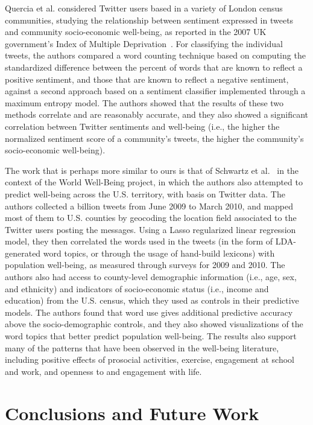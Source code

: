 \documentclass{acm_proc_article-sp}
\begin{document}
Quercia et al. considered Twitter users based in a variety of London census communities, studying the relationship between sentiment expressed in tweets and community socio-economic well-being, as reported in the 2007 UK government’s Index of Multiple Deprivation~\cite{Quercia:2012:TGC:2145204.2145347}. For classifying the individual tweets, the authors compared a word counting technique based on computing the standardized difference between the percent of words that are known to reflect a positive sentiment, and those that are known to reflect a negative sentiment, against a second approach based on a sentiment classifier implemented through a maximum entropy model. The authors showed that the results of these two methods correlate and are reasonably accurate, and they also showed a significant correlation between Twitter sentiments and well-being (i.e., the higher the normalized sentiment score of a community’s tweets, the higher the community’s socio-economic well-being).

The work that is perhaps more similar to ours is that of Schwartz et al.~\cite{Schwartz:2013:Tweets} in the context of the World Well-Being project, in which the authors also attempted to predict well-being across the U.S. territory, with basis on Twitter data. The authors collected a billion tweets from June 2009 to March 2010, and mapped most of them to U.S. counties by geocoding the location field associated to the Twitter users posting the messages. Using a Lasso regularized linear regression model, they then correlated the words used in the tweets (in the form of LDA-generated word topics, or through the usage of hand-build lexicons) with population well-being, as measured through surveys for 2009 and 2010. The authors also had access to county-level demographic information (i.e., age, sex, and ethnicity) and indicators of socio-economic status (i.e., income and education) from the U.S. census, which they used as controls in their predictive models. The authors found that word use gives additional predictive accuracy above the socio-demographic controls, and they also showed visualizations of the word topics that better predict population well-being. The results also support many of the patterns that have been observed in the well-being literature, including positive effects of prosocial activities, exercise, engagement at school and work, and openness to and engagement with life.

\section{Conclusions and Future Work}
\end{document}

